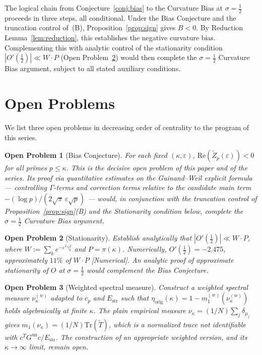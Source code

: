 \documentclass[11pt]{article}
\newtheorem*{openproblem}{Open Problem}
\newcommand{\Estr}{E_{\mathrm{str}}}
\newcommand{\etaorig}{\eta_{\mathrm{orig}}}
\newcommand{\Tt}{\widetilde{T}}
\newcommand{\Gun}{G^{\mathrm{un}}}
\newcommand{\Zt}{\widetilde{Z}}
\begin{document}
The logical chain from Conjecture~\ref{conj:bias} to the Curvature Bias
at $\sigma=\tfrac{1}{2}$ proceeds in three steps, all conditional.
Under the Bias Conjecture and the truncation control of~(B),
Proposition~\ref{prop:sign} gives $B<0$.
By Reduction Lemma~\ref{lem:reduction}, this establishes the
negative curvature bias.
Complementing this with analytic control of the stationarity condition
$|O'(\tfrac{1}{2})|\ll W\cdot P$ (Open Problem~\ref{op:stat})
would then complete the $\sigma=\tfrac{1}{2}$ Curvature Bias argument,
subject to all stated auxiliary conditions.

\section{Open Problems}
\label{sec:open}

We list three open problems in decreasing order of centrality
to the program of this series.

\begin{openproblem}[Bias Conjecture]
\label{op:bias}
For each fixed $(\kappa,\varepsilon)$,
$\mathrm{Re}(\Zt_p(\varepsilon))<0$ for all primes $p\leq\kappa$.
This is the decisive open problem of this paper and of the series.
Its proof via quantitative estimates on the Guinand--Weil explicit
formula --- controlling $\Gamma$-terms and correction terms relative
to the candidate main term $-(\log p)/(2\sqrt{\pi}\,\varepsilon\sqrt{p})$
--- would, in conjunction with the truncation control of
Proposition~\ref{prop:sign}(B) and the Stationarity condition below,
complete the $\sigma=\tfrac{1}{2}$ Curvature Bias argument.
\end{openproblem}

\begin{openproblem}[Stationarity]
\label{op:stat}
Establish analytically that $|O'(\tfrac{1}{2})|\ll W\cdot P$,
where $W:=\sum_k e^{-\varepsilon^2\gamma_k^2}$ and $P=\pi(\kappa)$.
Numerically, $O'(\tfrac{1}{2})=-2.475$, approximately $11\%$ of $W\cdot P$
[Numerical].
An analytic proof of approximate stationarity of $O$ at $\sigma=\tfrac{1}{2}$
would complement the Bias Conjecture.
\end{openproblem}

\begin{openproblem}[Weighted spectral measure]
\label{op:measure}
Construct a weighted spectral measure $\nu^{(w)}_\kappa$ adapted to
$c_p$ and $\Estr$ such that
$\etaorig(\kappa) = 1 - m_1^{(w)}(\nu^{(w)}_\kappa)$
holds algebraically at finite $\kappa$.
The plain empirical measure $\nu_\kappa=(1/N)\sum_j\delta_{\mu_j}$ gives
$m_1(\nu_\kappa)=(1/N)\mathrm{Tr}(\Tt)$, which is a normalized trace
not identifiable with $c^T\Gun c/\Estr$.
The construction of an appropriate weighted version,
and its $\kappa\to\infty$ limit, remain open.
\end{openproblem}
\end{document}
